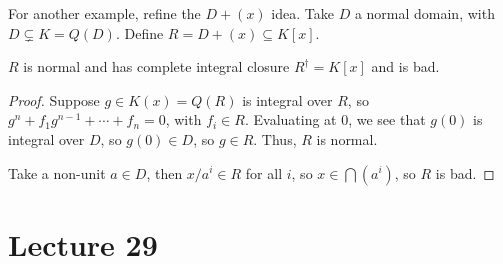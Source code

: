  For another example, refine the $D+(x)$ idea. Take $D$ a normal domain, with
 $D\subsetneq K=Q(D)$. Define $R= D+(x)\subseteq K[x]$.
 \begin{proposition}
   $R$ is normal and has complete integral closure $R^\dag = K[x]$ and is bad.
 \end{proposition}
 \begin{proof}
   Suppose $g\in K(x)=Q(R)$ is integral over $R$, so $g^n+f_1g^{n-1}+\cdots + f_n=0$,
   with $f_i\in R$. Evaluating at 0, we see that $g(0)$ is integral over $D$, so $g(0)\in
   D$, so $g\in R$. Thus, $R$ is normal.

   Take a non-unit $a\in D$, then $x/a^i\in R$ for all $i$, so $x\in \bigcap (a^i)$, so
   $R$ is bad.
 \end{proof}
 \setcounter{lecture}{29}
 \section{Lecture 29}

